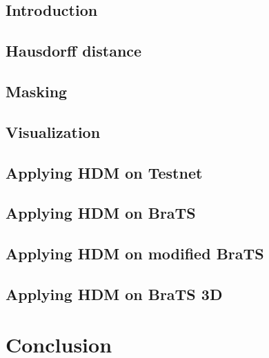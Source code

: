 \section{Introduction}
\section{Hausdorff distance}
\section{Masking}
\section{Visualization}
\section{Applying HDM on Testnet}
\section{Applying HDM on BraTS}
\section{Applying HDM on modified BraTS}
\section{Applying HDM on BraTS 3D}

\chapter{Conclusion}